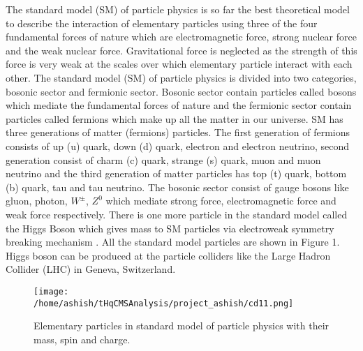 \documentclass[final,3p]{CSP}
\begin{document}
The standard model (SM) of particle physics is so far the best theoretical model to describe the interaction of elementary 
particles using three of the four fundamental forces of nature which are electromagnetic force, strong nuclear force and the 
weak nuclear force. Gravitational force is neglected as the strength of this force is very weak at the scales over which 
elementary particle interact with each other. The standard model (SM) of particle physics is divided into two categories, 
bosonic sector and fermionic sector. Bosonic sector contain particles called bosons which mediate the fundamental forces of 
nature and the fermionic sector contain particles called fermions which make up all the matter in our universe. SM has three 
generations of matter (fermions) particles. The first generation of fermions consists of up (u) quark, down (d) quark, electron 
and electron neutrino, second generation consist of charm (c) quark, strange (s) quark, muon and muon neutrino and the third 
generation of matter particles has top (t) quark, bottom (b) quark, tau and tau neutrino. The bosonic sector consist of gauge 
bosons like gluon, photon, $W^{\pm}$, $Z^0$ which mediate strong force, electromagnetic force and weak force respectively. There is one more particle in the standard model called the Higgs Boson which gives mass to SM particles via electroweak symmetry breaking mechanism \cite{Chatrchyan:2012xdj}. All the standard model particles are shown in Figure 1. Higgs boson can be produced at the particle colliders like the Large Hadron Collider (LHC) in Geneva, Switzerland.\\

\begin{figure}
  \centering
   \texttt{[image: /home/ashish/tHqCMSAnalysis/project\_ashish/cd11.png]}
  \caption{Elementary particles in standard model of particle physics with their mass, spin and charge.}
   \label{figure 1}
\end{figure}
\end{document}
